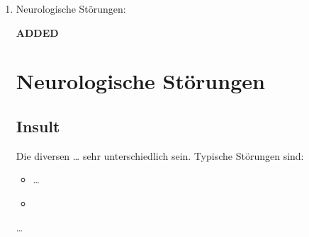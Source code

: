 \documentclass[
ngerman,
paper=a4,
asymmetric,
fontsize=10pt,
headings=small,
draft=false,
numbers=noenddot,
bibtotocnumbered,
footnotes=multiple,
]{scrreprt}
\newcommand{\jNEU}{{\color{green}\sffamily\textbf{ADDED}\hrulefill\newline\newline}}
\newcommand{\jNEUende}{\newline{\color{green}\rule{\linewidth}{3pt}\newline}}
\begin{document}
\begin{enumerate}
{\begin{itemize}
{  Senkung des Blutdrucks ist eine ärztliche Maßnahme.}
  \item {} inkl. Messung des  ist
  zwingend erforderlich!
  \item {}: Wenn verfügbar: , sonst
  Abklärung mit Leitstelle wegen Alternativen (Abt. für
  Neurologie oder Innere Medizin, mit Möglichkeit zur CT und
  Intensivüberwachung).
  \begin{enumerate}
    \item {}
    \item {}
    \item {}
  \end{enumerate}
\end{itemize}



\cite{Aass-1.0var1,AassMk-2013var1,MA70-Protokoll-2012-10-11,AsboeLvWien-2013-01-29,Lang2012,Ma70-Ausrueckordnung-2012-01-24}

}
{}
{}
{}
{}
\jNEUende

\item Neurologische Störungen:

\jNEU
\section{\CC{[NEU]} Neurologische Störungen}

\subsection{Insult}

\TextSlide{\TxSymptome}
{%
\label{topic:hirndruckzeichen}
Die diversen  {\ldots} 
sehr unterschiedlich
sein.  Typische Störungen sind:

\begin{itemize}
  \item \ldots
  \item {} 
\end{itemize}
}
{
\ldots
}{}{}{}


\end{enumerate}
\end{document}
